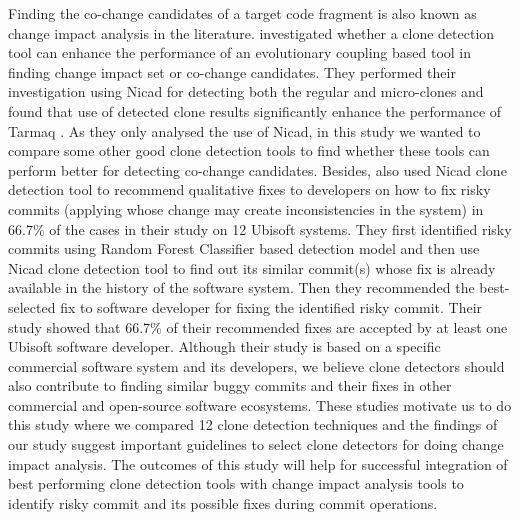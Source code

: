 \documentclass[review]{elsarticle}
\begin{document}
Finding the co-change candidates of a target code fragment is also known as change impact analysis \cite{book-change-impact} in the literature.  \citet{Mondal:Association:Rules} investigated whether a clone detection tool can enhance the performance of an evolutionary coupling based tool in finding change impact set or co-change candidates. They performed their investigation using Nicad for detecting both the regular and micro-clones and found that use of detected clone results significantly enhance the performance of Tarmaq \citet{TarmaqChangeImpact}. As they only analysed the use of Nicad, in this study we wanted to compare some other good clone detection tools to find whether these tools can perform better for detecting co-change candidates. Besides, \citet{CLEVER-JIT} also used Nicad clone detection tool to recommend qualitative fixes to developers on how to fix risky commits (applying whose change may create inconsistencies in the system) in 66.7\% of the cases in their study on 12 Ubisoft systems. They first identified risky commits using Random Forest Classifier \citet{RandomForestAlgo} based detection model and then use Nicad clone detection tool to find out its similar commit(s) whose fix is already available in the history of the software system. Then they recommended the best-selected fix to software developer for fixing the identified risky commit. Their study showed that 66.7\% of their recommended fixes are accepted by at least one Ubisoft software developer. Although their study is based on a specific commercial software system and its developers, we believe clone detectors should also contribute to finding similar buggy commits and their fixes in other commercial and open-source software ecosystems. These studies motivate us to do this study where we compared 12 clone detection techniques and the findings of our study suggest important guidelines to select clone detectors for doing change impact analysis. The outcomes of this study will help for successful integration of best performing clone detection tools with change impact analysis tools to identify risky commit and its possible fixes during commit operations.   
\end{document}
